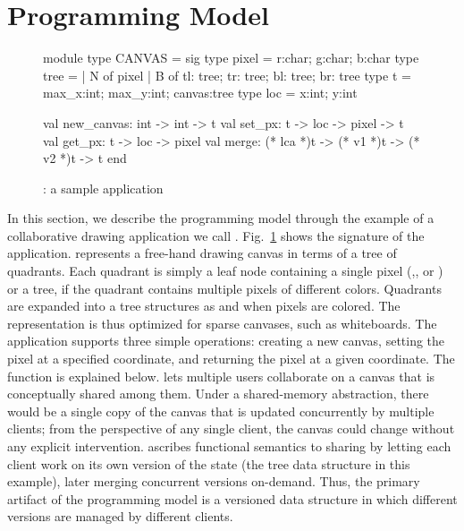 \section{Programming Model}
\label{sec:model}

\begin{figure}
\begin{center}
  \begin{ocaml}
  module type CANVAS = sig
    type pixel = {r:char; g:char; b:char}
    type tree =
      | N of pixel
      | B of {tl: tree; tr: tree; bl: tree; br: tree}
    type t = {max_x:int; max_y:int; canvas:tree}
    type loc = {x:int; y:int}

    val new_canvas: int -> int -> t
    val set_px: t -> loc -> pixel -> t
    val get_px: t -> loc -> pixel
    val merge: (* lca *)t -> (* v1 *)t -> (* v2 *)t -> t
  end
  \end{ocaml}
\end{center}
\caption{\drawsome: a sample \name application}
\label{fig:canvas-sig}
\end{figure}

In this section, we describe the \name programming model through the
example of a collaborative drawing application we call \drawsome.
Fig.~\ref{fig:canvas-sig} shows the signature of the \drawsome
application. \drawsome represents a free-hand drawing canvas in terms
of a tree of quadrants.  Each quadrant is simply a leaf node
containing a single pixel (,, or ) or a tree, if the
quadrant contains multiple pixels of different colors. Quadrants are
expanded into a tree structures as and when pixels are colored.  The
representation is thus optimized for sparse canvases, such as
whiteboards. The application supports three simple operations:
creating a new canvas, setting the pixel at a specified coordinate,
and returning the pixel at a given coordinate. The  function
is explained below.  \drawsome lets multiple users collaborate on a
canvas that is conceptually shared among them. Under a shared-memory
abstraction, there would be a single copy of the canvas that is
updated concurrently by multiple clients; from the perspective of any
single client, the canvas could change without any explicit
intervention. \name ascribes functional semantics to sharing by
letting each client work on its own version of the state (the tree
data structure in this example), later merging concurrent versions
on-demand.  Thus, the primary artifact of the \name programming model
is a versioned data structure in which different versions are managed
by different clients.

